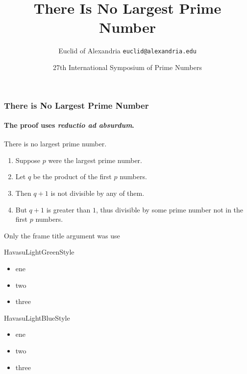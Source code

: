 \documentclass{beamer}
\title{There Is No Largest Prime Number}
\date[ISPN ’80]{27th International Symposium of Prime Numbers}
\author[Euclid]{Euclid of Alexandria \texttt{euclid@alexandria.edu}}
\begin{document}

\begin{frame}
\titlepage%
\end{frame}


\begin{frame}%
  \frametitle{\hspace{4mm}There is No Largest Prime Number}%
  \framesubtitle{\hspace{4mm}The proof uses \textit{reductio ad absurdum}.}%
  \begin{theorem}%
    There is no largest prime number.%
  \end{theorem}%
  \begin{enumerate}%
    \item<1-| alert@1> Suppose $p$ were the largest prime number.%
    \item<2-> Let $q$ be the product of the first $p$ numbers.%
    \item<3-> Then $q+1$ is not divisible by any of them.%
    \item<1-> But $q + 1$ is greater than $1$, thus divisible by some prime%
    number not in the first $p$ numbers.%
  \end{enumerate}%
\end{frame}%


\begin{frame}{\hspace{4mm}Only the frame title argument was use}%
  \begin{mdframed}[style=HavasuLightGreenStyle]
    \large{HavasuLightGreenStyle}
    \begin{itemize}%
      \item ene%
      \item two%
      \item three%
    \end{itemize}%
  \end{mdframed}%

  \begin{mdframed}[style=HavasuLightBlueStyle]
    \large{HavasuLightBlueStyle}
    \begin{itemize}%
      \item ene%
      \item two%
      \item three%
    \end{itemize}%
  \end{mdframed}%
\end{frame}%
\end{document}
